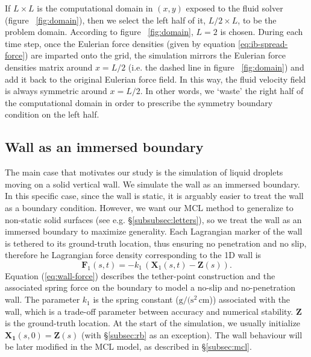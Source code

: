 \documentclass{jfm}
\newcommand{\charles}[1]{\todo[inline,color=blue!40]{Charles: #1}}
\begin{document}
If $L \times L$ is the computational domain in $(x,y)$ exposed to the fluid solver (figure ~\ref{fig:domain}), then we select the left half of it, $L/2 \times L$, to be the problem domain. According to figure ~\ref{fig:domain}, $L=2$ is chosen. During each time step, once the Eulerian force densities (given by equation \ref{eq:ib-spread-force}) are imparted onto the grid, the simulation mirrors the Eulerian force densities matrix around $x = L/2$ (i.e. the dashed line in figure ~\ref{fig:domain}) and add it back to the original Eulerian force field. In this way, the fluid velocity field is always symmetric around $x = L/2$. In other words, we `waste' the right half of the computational domain in order to prescribe the symmetry boundary condition on the left half. 


\subsection{Wall as an immersed boundary} \label{subsec:wall}
The main case that motivates our study is the simulation of liquid droplets moving on a solid vertical wall. We simulate the wall as an immersed boundary. In this specific case, since the wall is static, it is arguably easier to treat the wall as a boundary condition. However, we want our MCL method to generalize to non-static solid surfaces (see e.g. \S\ref{subsubsec:letters}), so we treat the wall as an immersed boundary to maximize generality. Each Lagrangian marker of the wall is tethered to its ground-truth location, thus ensuring no penetration and no slip, therefore he Lagrangian force density corresponding to the 1D wall is
\begin{equation}
\bm{F}_1(s,t) = -k_1 \, (
    \bm{X}_1(s,t) - \bm{Z}(s)
). 
\label{eq:wall-force}
\end{equation}
Equation (\ref{eq:wall-force}) describes the tether-point construction and the associated spring force on the boundary to model a no-slip and no-penetration wall. The parameter $k_1$ is the spring constant ($\text{g}/(\text{s}^2\,\text{cm}$)) associated with the wall, which is a trade-off parameter between accuracy and numerical stability. $\boldsymbol{Z}$ is the ground-truth location. At the start of the simulation, we usually initialize $\boldsymbol{X_1}(s,0) = \boldsymbol{Z}(s)$ (with \S\ref{subsec:rb} as an exception). The wall behaviour will be later modified in the MCL model, as described in \S\ref{subsec:mcl}. 
\end{document}
